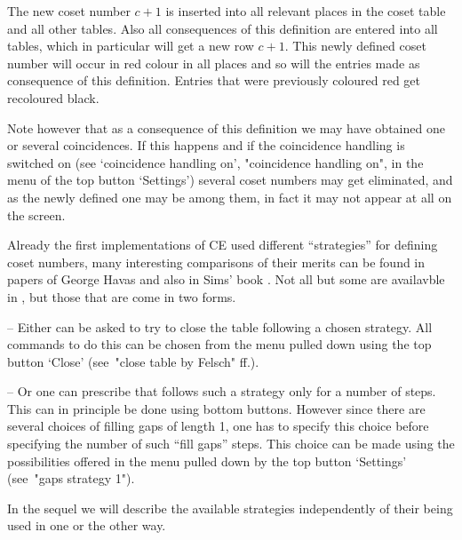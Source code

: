 The new coset number $c+1$ is inserted into all relevant places in the
coset table and all other tables. Also all consequences of this
definition are entered into all tables, which in particular will get a
new row $c+1$. This newly defined coset number will occur in red
colour in all places and so will the entries made as consequence of
this definition. Entries that were previously coloured red get
recoloured black.

Note however that as a consequence of this definition we may have
obtained one or several coincidences. If this happens and if the
coincidence handling is switched on (see `coincidence handling on',
"coincidence handling on", in the menu of the top button `Settings')
several coset numbers may get eliminated, and as the newly defined one
may be among them, in fact it may not appear at all on the screen.




Already the first implementations of CE used different ``strategies''
for defining coset numbers, many interesting comparisons of their
merits can be found in papers of George Havas and also in Sims' book
\cite{Sims94}. Not all but some are availavble in {\ITC}, but those
that are come in two forms.

\beginlist

\item{--}
  Either {\ITC} can be asked to try to close the table following a
  chosen strategy. All commands to do this can be chosen from the menu
  pulled down using the top button `Close' (see~"close table by Felsch"
  ff.).

\item{--} Or one can prescribe that {\ITC} follows such a strategy
  only for a number of steps. This can in principle be done using
  bottom buttons. However since there are several choices of filling
  gaps of length 1, one has to specify this choice before specifying
  the number of such ``fill gaps'' steps. This choice can be made using
  the possibilities offered in the menu pulled down by the top button
  `Settings' (see~"gaps strategy 1").

\endlist

In the sequel we will describe the available strategies independently
of their being used in one or the other way.

